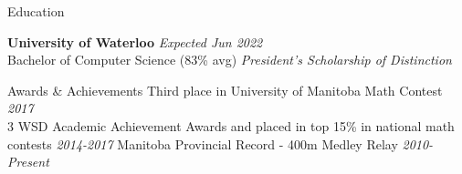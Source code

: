 \documentclass{resume} %
\newcommand{\award}[2]{#1 \hfill {\em #2}}
\begin{document}
\begin{rSection}{Education}

    {\bf University of Waterloo} \hfill {\em Expected Jun 2022} \\
    Bachelor of Computer Science (83\% avg) \hfill {\em President's Scholarship of Distinction}
    
\end{rSection}


\begin{rSection}{Awards \& Achievements}
    \award{Third place in University of Manitoba Math Contest}{2017} \\
    \award{3 WSD Academic Achievement Awards and placed in top 15\% in national math contests}{2014-2017}
    \award{Manitoba Provincial Record - 400m Medley Relay } {2010-Present}
\end{rSection}


    
    
\end{document}

